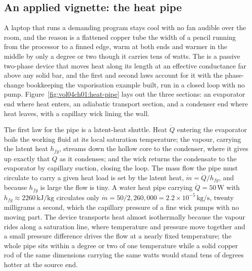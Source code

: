 \subsection*{An applied vignette: the heat pipe}

A laptop that runs a demanding program stays cool with no fan audible over the
room, and the reason is a flattened copper tube the width of a pencil running
from the processor to a finned edge, warm at both ends and warmer in the middle
by only a degree or two though it carries tens of watts. The 
is a passive two-phase device that moves heat along its length at an effective
conductance far above any solid bar, and the first and second laws account for it
with the phase-change bookkeeping the vaporisation example built, run in a closed
loop with no pump. Figure~\ref{fig:vol04ch01:heat-pipe} lays out the three
sections: an evaporator end where heat enters, an adiabatic transport section,
and a condenser end where heat leaves, with a capillary wick lining the wall.

The first law for the pipe is a latent-heat shuttle. Heat $\dot Q$ entering the
evaporator boils the working fluid at its local saturation temperature; the
vapour, carrying the latent heat $h_{fg}$, streams down the hollow core to the
condenser, where it gives up exactly that $\dot Q$ as it condenses; and the wick
returns the condensate to the evaporator by capillary suction, closing the loop.
The mass flow the pipe must circulate to carry a given heat load is set by the
latent heat, $\dot m = \dot Q/h_{fg}$, and because $h_{fg}$ is large the flow is
tiny. A water heat pipe carrying $\dot Q = 50\,\text{W}$ with $h_{fg} \approx
2260\,\text{kJ}/\text{kg}$ circulates only $\dot m = 50/2{,}260{,}000 = 2.2\times
10^{-5}\,\text{kg}/\text{s}$, twenty milligrams a second, which the capillary
pressure of a fine wick pumps with no moving part. The device transports heat
almost isothermally because the vapour rides along a saturation line, where
temperature and pressure move together and a small pressure difference drives the
flow at a nearly fixed temperature; the whole pipe sits within a degree or two of
one temperature while a solid copper rod of the same dimensions carrying the same
watts would stand tens of degrees hotter at the source end.

